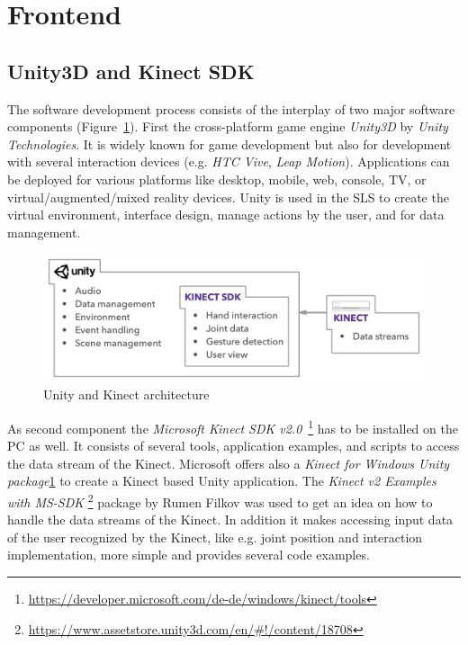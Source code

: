 \section{Frontend}\label{5_4_software}
\subsection{Unity3D and Kinect SDK}
The software development process consists of the interplay of two major software components (Figure~\ref{fig:5_3_unityKinectArchitecture}).
First the cross-platform game engine \textit{Unity3D} by \textit{Unity Technologies}. It is widely known for game development but also for development with several interaction devices (e.g. \textit{HTC Vive}, \textit{Leap Motion}). Applications can be deployed for various platforms like desktop, mobile, web, console, TV, or virtual/augmented/mixed reality devices.
Unity is used in the SLS to create the virtual environment, interface design, manage actions by the user, and for data management.
\begin{figure}[htb]
	\centering
	\begin{minipage}[t]{1\linewidth}
		\centering
		\includegraphics[width=1\linewidth]{Pictures/5_3_unityKinectArchitecture}
		\caption{Unity and Kinect architecture}%
		\label{fig:5_3_unityKinectArchitecture}
	\end{minipage}
\end{figure}

As second component the \textit{Microsoft Kinect SDK v2.0}~\footnote{\label{fn:kinectTools}\url{https://developer.microsoft.com/de-de/windows/kinect/tools}} has to be installed on the PC as well.
It consists of several tools, application examples, and scripts to access the data stream of the Kinect.
Microsoft offers also a \textit{Kinect for Windows Unity package}\cref{fn:kinectTools} to create a Kinect based Unity application.
The \textit{Kinect v2 Examples with MS-SDK} \footnote{\url{https://www.assetstore.unity3d.com/en/\#!/content/18708}} package by Rumen Filkov was used to get an idea on how to handle the data streams of the Kinect.
In addition it makes accessing input data of the user recognized by the Kinect, like e.g. joint position and interaction implementation, more simple and provides several code examples.


